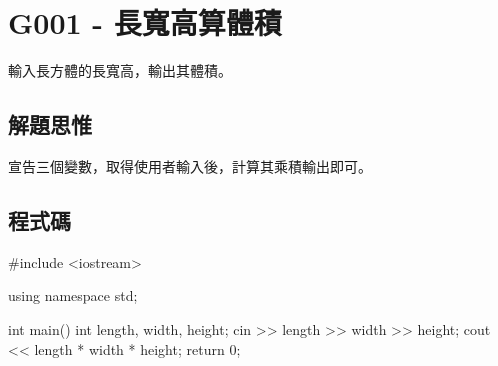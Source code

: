 \section{G001 - 長寬高算體積}
輸入長方體的長寬高，輸出其體積。
\subsection{解題思惟}
宣告三個變數，取得使用者輸入後，計算其乘積輸出即可。
\subsection{程式碼}
\begin{cppcode}
#include <iostream>

using namespace std;

int main()
{
	int length, width, height;
	cin >> length >> width >> height;
	cout << length * width * height;
	return 0;
}
\end{cppcode}
